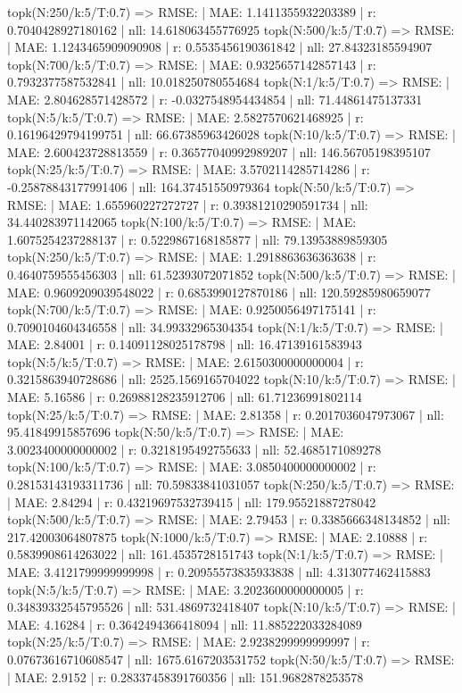 topk(N:250/k:5/T:0.7) => RMSE: | MAE: 1.1411355932203389 | r: 0.7040428927180162 | nll: 14.618063455776925
topk(N:500/k:5/T:0.7) => RMSE: | MAE: 1.1243465909090908 | r: 0.5535456190361842 | nll: 27.84323185594907
topk(N:700/k:5/T:0.7) => RMSE: | MAE: 0.9325657142857143 | r: 0.7932377587532841 | nll: 10.018250780554684
topk(N:1/k:5/T:0.7) => RMSE: | MAE: 2.804628571428572 | r: -0.0327548954434854 | nll: 71.44861475137331
topk(N:5/k:5/T:0.7) => RMSE: | MAE: 2.5827570621468925 | r: 0.16196429794199751 | nll: 66.67385963426028
topk(N:10/k:5/T:0.7) => RMSE: | MAE: 2.600423728813559 | r: 0.36577040992989207 | nll: 146.56705198395107
topk(N:25/k:5/T:0.7) => RMSE: | MAE: 3.5702114285714286 | r: -0.25878843177991406 | nll: 164.37451550979364
topk(N:50/k:5/T:0.7) => RMSE: | MAE: 1.655960227272727 | r: 0.39381210290591734 | nll: 34.440283971142065
topk(N:100/k:5/T:0.7) => RMSE: | MAE: 1.6075254237288137 | r: 0.5229867168185877 | nll: 79.13953889859305
topk(N:250/k:5/T:0.7) => RMSE: | MAE: 1.2918863636363638 | r: 0.4640759555456303 | nll: 61.52393072071852
topk(N:500/k:5/T:0.7) => RMSE: | MAE: 0.9609209039548022 | r: 0.6853990127870186 | nll: 120.59285980659077
topk(N:700/k:5/T:0.7) => RMSE: | MAE: 0.9250056497175141 | r: 0.7090104604346558 | nll: 34.99332965304354
topk(N:1/k:5/T:0.7) => RMSE: | MAE: 2.84001 | r: 0.14091128025178798 | nll: 16.47139161583943
topk(N:5/k:5/T:0.7) => RMSE: | MAE: 2.6150300000000004 | r: 0.3215863940728686 | nll: 2525.1569165704022
topk(N:10/k:5/T:0.7) => RMSE: | MAE: 5.16586 | r: 0.26988128235912706 | nll: 61.71236991802114
topk(N:25/k:5/T:0.7) => RMSE: | MAE: 2.81358 | r: 0.2017036047973067 | nll: 95.41849915857696
topk(N:50/k:5/T:0.7) => RMSE: | MAE: 3.0023400000000002 | r: 0.3218195492755633 | nll: 52.4685171089278
topk(N:100/k:5/T:0.7) => RMSE: | MAE: 3.0850400000000002 | r: 0.28153143193311736 | nll: 70.59833841031057
topk(N:250/k:5/T:0.7) => RMSE: | MAE: 2.84294 | r: 0.43219697532739415 | nll: 179.95521887278042
topk(N:500/k:5/T:0.7) => RMSE: | MAE: 2.79453 | r: 0.3385666348134852 | nll: 217.42003064807875
topk(N:1000/k:5/T:0.7) => RMSE: | MAE: 2.10888 | r: 0.5839908614263022 | nll: 161.4535728151743
topk(N:1/k:5/T:0.7) => RMSE: | MAE: 3.4121799999999998 | r: 0.20955573835933838 | nll: 4.313077462415883
topk(N:5/k:5/T:0.7) => RMSE: | MAE: 3.2023600000000005 | r: 0.34839332545795526 | nll: 531.4869732418407
topk(N:10/k:5/T:0.7) => RMSE: | MAE: 4.16284 | r: 0.3642494366418094 | nll: 11.885222033284089
topk(N:25/k:5/T:0.7) => RMSE: | MAE: 2.9238299999999997 | r: 0.07673616710608547 | nll: 1675.6167203531752
topk(N:50/k:5/T:0.7) => RMSE: | MAE: 2.9152 | r: 0.28337458391760356 | nll: 151.9682878253578
